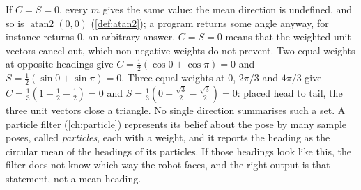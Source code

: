 If $C=S=0$, every $m$ gives the same value: the mean direction is
undefined, and so is $\operatorname{atan2}(0,0)$ (\cref{def:atan2}); a
program returns some angle anyway, for instance 
returns $0$, an arbitrary answer. $C=S=0$ means that the weighted unit
vectors cancel out, which non-negative weights do not prevent. Two
equal weights at opposite headings give $C=\tfrac12(\cos0+\cos\pi)=0$ and
$S=\tfrac12(\sin0+\sin\pi)=0$. Three equal weights at $0$, $2\pi/3$ and
$4\pi/3$ give $C=\tfrac13(1-\tfrac12-\tfrac12)=0$ and
$S=\tfrac13(0+\tfrac{\sqrt3}2-\tfrac{\sqrt3}2)=0$: placed head to tail,
the three unit vectors close a triangle. No single direction summarises
such a set. A particle filter (\cref{ch:particle}) represents its
belief about the pose by many sample poses, called \emph{particles},
each with a weight, and it reports the heading as the circular mean of
the headings of its particles. If those headings look like this, the
filter does not know which way the robot faces, and the right output is
that statement, not a mean heading.

